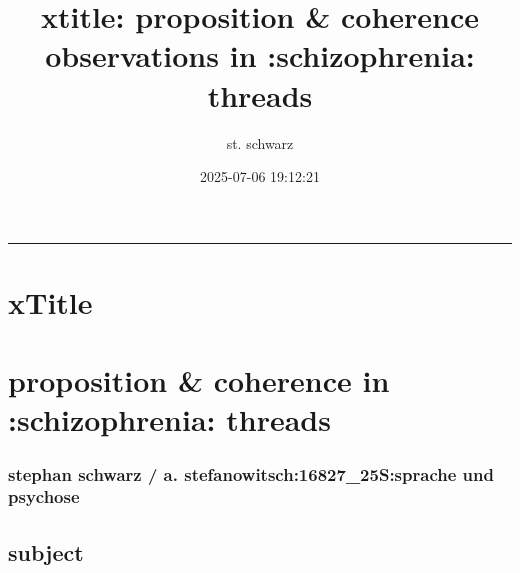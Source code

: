 \documentclass[]{tufte-handout}
\title[xtitle]{xtitle: proposition \& coherence observations in
:schizophrenia: threads}
\author{st. schwarz}
\date{2025-07-06 19:12:21}
\begin{document}
\maketitle




\begin{center}\rule{0.5\linewidth}{0.5pt}\end{center}

\section{xTitle}\label{xtitle}

\section{proposition \& coherence in :schizophrenia:
threads}\label{proposition-coherence-in-schizophrenia-threads}

\subsubsection{stephan schwarz / a. stefanowitsch:16827\_25S:sprache und
psychose}\label{stephan-schwarz-a.-stefanowitsch16827_25ssprache-und-psychose}

\subsection{subject}\label{subject}
\end{document}
